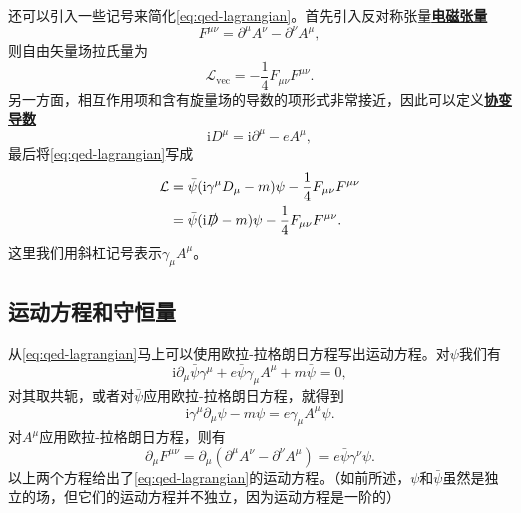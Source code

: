 \documentclass[UTF8, a4paper]{ctexart}
\newcommand*{\ii}{\mathrm{i}}
\newcommand*{\concept}[1]{\underline{\textbf{#1}}}
\begin{document}
还可以引入一些记号来简化\eqref{eq:qed-lagrangian}。首先引入反对称张量\concept{电磁张量}
\begin{equation}
    F^{\mu \nu} = \partial^\mu A^\nu - \partial^\nu A^\mu,
\end{equation}
则自由矢量场拉氏量为
\[
    \mathcal{L}_\text{vec} = - \frac{1}{4} F_{\mu \nu} F^{\mu \nu}.
\]
另一方面，相互作用项和含有旋量场的导数的项形式非常接近，因此可以定义\concept{协变导数}
\begin{equation}
    \ii D^\mu = \ii \partial^\mu - e A^\mu,
\end{equation}
最后将\eqref{eq:qed-lagrangian}写成
\begin{equation}
    \begin{aligned}
        \mathcal{L} &= \bar{\psi} (\ii \gamma^\mu D_\mu - m) \psi - \frac{1}{4} F_{\mu \nu} F^{\mu \nu} \\
        &= \bar{\psi} (\ii \slashed{D} - m) \psi - \frac{1}{4} F_{\mu \nu} F^{\mu \nu}. 
    \end{aligned}
    \label{eq:short-qed-lagrangian}
\end{equation}
这里我们用斜杠记号表示$\gamma_\mu A^\mu$。

\subsection{运动方程和守恒量}\label{sec:four-eqs}

从\eqref{eq:qed-lagrangian}马上可以使用欧拉-拉格朗日方程写出运动方程。对$\psi$我们有
\[
    \ii \partial_\mu \bar{\psi} \gamma^\mu + e \bar{\psi} \gamma_\mu A^\mu + m \bar{\psi} = 0,
\]
对其取共轭，或者对$\bar{\psi}$应用欧拉-拉格朗日方程，就得到
\begin{equation}
    \ii \gamma^\mu \partial_\mu \psi - m \psi = e \gamma_\mu A^\mu \psi.
    \label{eq:movement-eq-1}
\end{equation}
对$A^\mu$应用欧拉-拉格朗日方程，则有
\begin{equation}
    \partial_\mu F^{\mu \nu} = \partial_\mu (\partial^\mu A^\nu - \partial^\nu A^\mu) = e \bar{\psi} \gamma^\nu \psi.
    \label{eq:movement-eq-2}
\end{equation}
以上两个方程给出了\eqref{eq:qed-lagrangian}的运动方程。（如前所述，$\psi$和$\bar{\psi}$虽然是独立的场，但它们的运动方程并不独立，因为运动方程是一阶的）
\end{document}
